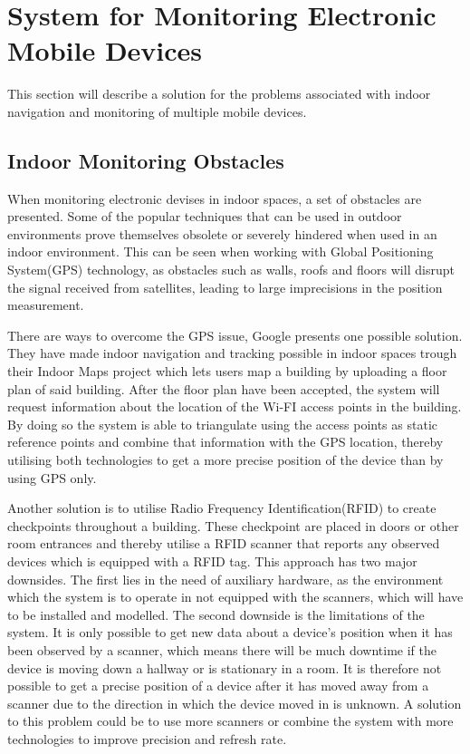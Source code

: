 \section{System for Monitoring Electronic Mobile Devices}\label{sec:monitoring}
This section will describe a solution for the problems associated with indoor navigation and monitoring of multiple mobile devices.

\subsection{Indoor Monitoring Obstacles}
When monitoring electronic devises in indoor spaces, a set of obstacles are presented. Some of the popular techniques that can be used in outdoor environments prove themselves obsolete or severely hindered when used in an indoor environment. This can be seen when working with Global Positioning System(GPS) technology, as obstacles such as walls, roofs and floors will disrupt the signal received from satellites, leading to large imprecisions in the position measurement.

There are ways to overcome the GPS issue, Google presents one possible solution. They have made indoor navigation and tracking possible in indoor spaces trough their Indoor Maps project  which lets users map a building by uploading a floor plan of said building. After the floor plan have been accepted, the system will request information about the location of the Wi-FI access points in the building. By doing so the system is able to triangulate using the access points as static reference points and combine that information with the GPS location, thereby utilising both technologies to get a more precise position of the device than by using GPS only.

Another solution is to utilise Radio Frequency Identification(RFID) to create checkpoints throughout a building. These checkpoint are placed in doors or other room entrances and thereby utilise a RFID scanner that reports any observed devices which is equipped with a RFID tag\cite{indoor_bin}. %
This approach has two major downsides. The first lies in the need of auxiliary hardware, as the environment which the system is to operate in not equipped with the scanners, which will have to be installed and modelled. The second downside is the limitations of the system. It is only possible to get new data about a device's position when it has been observed by a scanner, which means there will be much downtime if the device is moving down a hallway or is stationary in a room. It is therefore not possible to get a precise position of a device after it has moved away from a scanner due to the direction in which the device moved in is unknown. A solution to this problem could be to use more scanners or combine the system with more technologies to improve precision and refresh rate.

